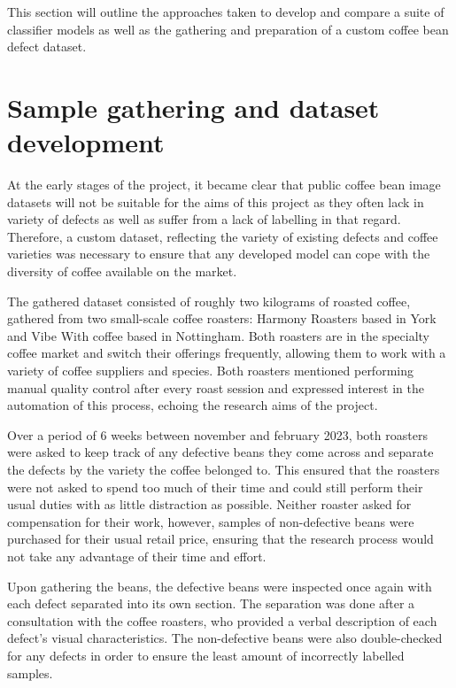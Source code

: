 This section will outline the approaches taken to develop and compare a suite of
classifier models as well as the gathering and preparation of a custom coffee
bean defect dataset.

\section{Sample gathering and dataset development}
\label{sec:sample-gathering-and-dataset-development} At the early stages of the
project, it became clear that public coffee bean image datasets will not be suitable
for the aims of this project as they often lack in variety of defects as well as
suffer from a lack of labelling in that regard.
Therefore, a custom dataset,
reflecting the variety of existing defects and coffee varieties was necessary to
ensure that any developed model can cope with the diversity of coffee available
on the market.

The gathered dataset consisted of roughly two kilograms of roasted coffee, gathered
from two small-scale coffee roasters: Harmony Roasters based in York and Vibe
With coffee based in Nottingham.
Both roasters are in the specialty coffee market
and switch their offerings frequently, allowing them to work with a variety of
coffee suppliers and species.
Both roasters mentioned performing manual quality control
after every roast session and expressed interest in the automation of this process,
echoing the research aims of the project.

Over a period of 6 weeks between november and february 2023, both roasters were asked
to keep track of any defective beans they come across and separate the defects by
the variety the coffee belonged to.
This ensured that the roasters were not
asked to spend too much of their time and could still perform their usual duties
with as little distraction as possible.
Neither roaster asked for compensation for
their work, however, samples of non-defective beans were purchased for their usual
retail price, ensuring that the research process would not take any advantage of
their time and effort.

Upon gathering the beans, the defective beans were inspected once again with each
defect separated into its own section.
The separation was done after a
consultation with the coffee roasters, who provided a verbal description of each
defect's visual characteristics.
The non-defective beans were also double-checked
for any defects in order to ensure the least amount of incorrectly labelled
samples.

